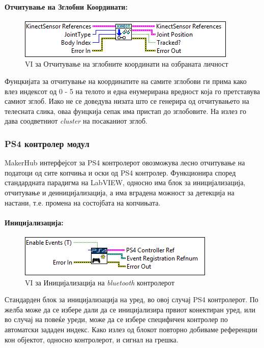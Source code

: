 \documentclass[12pt]{article}
\begin{document}
      \paragraph{Отчитување на Зглобни Координати:\\}
	\begin{figure}[H]
	    \includegraphics[width=0.55\linewidth]{./images/kinect_joints_border.PNG}
	    \caption{VI за Отчитување на зглобните координати на озбраната личност}
	    \label{fig:kinect_joints.PNG}
	    \raggedright
	    \end{figure}
        Фунцкијата за отчитување на координатите на самите зглобови ги прима како влез индексот од 0 - 5 на телото и една енумерирана вредност која го претставува самиот зглоб. Иако не се доведува низата што се генерира од отчитувањето на телесната слика, оваа фунцкија сепак има пристап до зглобовите. На излез го дава соодветниот \textit{cluster} на посаканиот зглоб.

    \subsubsection{PS4 контролер модул}
      MakerHub интерфејсот за PS4 контролерот овозможува лесно отчитување на податоци од сите копчиња и оски од PS4 контролер. Функционира според стандардната парадигма на LabVIEW, односно има блок за иницијализација, отчитување и деиницијализација, а има вградена можност за детекција на настани, т.е. промена на состојбата на копчињата.

      \paragraph{Иницијализација:\\}
	\begin{figure}[H]
	    \includegraphics[width=0.55\linewidth]{./images/controller_init_border.PNG}
		\caption{VI за Иницијализација на \textit{bluetooth} контролерот}
	    \label{fig:controller_init.PNG}
	    \raggedright
	    \end{figure}
        Стандарден блок за иницијализација на уред, во овој случај PS4 контролерот. По желба може да се избере дали да се иницијализира првиот конектиран уред, или во случај на повеќе уреди, може да се избере специфичен контролер по автоматски зададен индекс. Како излез од блокот повторно добиваме референции кон објектот, односно контролерот, и сигнал на грешка.
\end{document}
